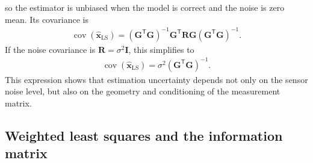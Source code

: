 \documentclass[11pt,oneside,openany]{book}
\begin{document}
so the estimator is unbiased when the model is correct and the noise is zero mean. Its covariance is
\begin{align}
\operatorname{cov} \left( \widehat{\mathbf{x}}_{\mathrm{LS}} \right) =
\left(
\mathbf{G}^{\mathsf T}
\mathbf{G}
\right)^{-1}
\mathbf{G}^{\mathsf T}
\mathbf{R}
\mathbf{G}
\left(
\mathbf{G}^{\mathsf T}
\mathbf{G}
\right)^{-1}.
\end{align}
If the noise covariance is $\mathbf{R}=\sigma^2\mathbf{I}$, this simplifies to
\begin{align}
\operatorname{cov} \left(\widehat{\mathbf{x}}_{\mathrm{LS}} \right) = \sigma^2\left( \mathbf{G}^{\mathsf T} \mathbf{G} \right)^{-1}.
\end{align}
This expression shows that estimation uncertainty depends not only on the sensor noise level, but also on the geometry and conditioning of the measurement matrix.

\subsection{Weighted least squares and the information matrix}
\end{document}
